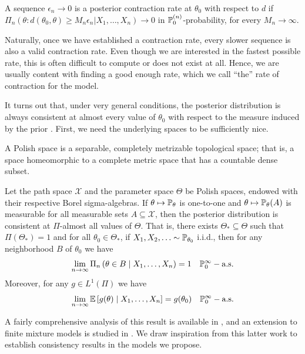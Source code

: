 \begin{definition}
  A sequence \(\epsilon_n\to 0\) is a posterior contraction rate at \(\theta_0\) with respect to \(d\) if \(\Pi_n(\theta: d(\theta_0, \theta) \geq M_n \epsilon_n | X_1,\dots, X_n) \to 0\) in \(\mathbb{P}_0^{(n)}\)-probability, for every \(M_n\to\infty\).
\end{definition}

Naturally, once we have established a contraction rate, every slower sequence is also a valid contraction rate. Even though we are interested in the fastest possible rate, this is often difficult to compute or does not exist at all. Hence, we are usually content with finding a good enough rate, which we call ``the'' rate of contraction for the model.

It turns out that, under very general conditions, the posterior distribution is always consistent at almost every value of \(\theta_0\) with respect to the measure induced by the prior \citep{doob1949application}. First, we need the underlying spaces to be sufficiently nice.

\begin{definition}
  A Polish space is a separable, completely metrizable topological space; that is, a space homeomorphic to a complete metric space that has a countable dense subset.
\end{definition}

\begin{theorem}\label{th:doob}
  Let the path space \(\mathcal X\) and the parameter space \(\Theta\) be Polish spaces, endowed with their respective Borel sigma-algebras. If \(\theta \mapsto \mathbb{P}_\theta\) is one-to-one and \(\theta \mapsto \mathbb{P}_\theta(A)\) is measurable for all measurable sets \(A\subseteq \mathcal X\), then the posterior distribution is consistent at \(\Pi\)-almost all values of \(\Theta\). That is, there exists \(\Theta_*\subseteq \Theta\) such that \(\Pi(\Theta_*)=1\) and for all \(\theta_0\in\Theta_*\), if \(X_1,X_2,\ldots \sim \mathbb{P}_{\theta_0}\) i.i.d., then for any neighborhood \(B\) of \(\theta_0\) we have
  \[
    \lim_{n\to\infty} \Pi_n\left(\theta \in B \mid X_1,\dots, X_n\right) = 1 \quad \mathbb{P}_{0}^\infty-\text{a.s.}
  \]
  Moreover, for any \(g\in L^1(\Pi)\) we have
  \[
  \lim_{n\to\infty} \mathbb{E}\left[g(\theta)\mid X_1,\dots, X_n\right] = g(\theta_0) \quad \mathbb{P}_0^\infty-\text{a.s.}
  \]
\end{theorem}

A fairly comprehensive analysis of this result is available in \citet{miller2018detailed}, and an extension to finite mixture models is studied in \citet{miller2023consistency}. We draw inspiration from this latter work to establish consistency results in the models we propose.

